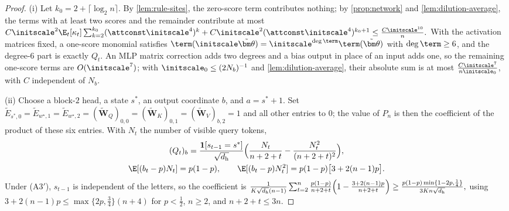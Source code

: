 \begin{proof}
(i) Let $k_0=2+\lceil\log_2n\rceil$. By \cref{lem:rule-sites}, the zero-score term contributes nothing; by \cref{prop:network} and
\cref{lem:dilution-average}, the terms with at least two scores and the remainder contribute at most
 $C\initscale^2\E_t[\kappa_t]\sum_{k=2}^{k_0}(\attconst\initscale^4)^k+C\initscale^2(\attconst\initscale^4)^{k_0+1}\le\frac{C\initscale^{10}}{n} .$ 
With the activation matrices fixed, a one-score monomial satisfies $\term(\initscale\tilde{\bm\theta})=\initscale^{\deg\term}\term(\tilde{\bm\theta})$ with $\deg\term\ge6$, and the
degree-$6$ part is exactly $Q_t$. An MLP matrix correction adds two degrees and a bias output in place of an input adds one, so the
remaining one-score terms are $O(\initscale^7)$; with $\initscale_0\le(2N_b)^{-1}$ and \cref{lem:dilution-average}, their absolute sum is at most
$\frac{C\initscale^7}{n\initscale_0}$, with $C$ independent of $N_b$.

(ii) Choose a block-$2$ head, a state $s^\ast$, an output coordinate $b$, and $a=s^\ast+1$. Set
$\tilde E_{s^\ast,0}=\tilde E_{w^\star,1}=\tilde E_{w^\star,2}=(\tilde{\mathbf W}_Q)_{0,0}=(\tilde{\mathbf W}_K)_{0,1}=(\tilde{\mathbf W}_V)_{b,2}=1$ and all other entries to $0$; the value of $P_n$ is then the
coefficient of the product of these six entries. With $N_t$ the number of visible query tokens,
\begin{gather*}
 (Q_t)_b=\frac{\mathbf 1[s_{t-1}=s^\ast]}{\sqrt{d_{\mathrm h}}}\Bigl(\frac{N_t}{n+2+t}-\frac{N_t^2}{(n+2+t)^2}\Bigr),\\
 \E[(b_t-p)N_t]=p(1-p),\qquad \E[(b_t-p)N_t^2]=p(1-p)\bigl[3+2(n-1)p\bigr].
\end{gather*}
Under (A3$'$), $s_{t-1}$ is independent of the letters, so the coefficient is
 $\frac{1}{K\sqrt{d_{\mathrm h}}(n-1)}\sum_{t=2}^n\frac{p(1-p)}{n+2+t}\Bigl(1-\frac{3+2(n-1)p}{n+2+t}\Bigr) \ge\frac{p(1-p)\min\{1-2p,\frac{1}{4}\}}{3Kn\sqrt{d_{\mathrm h}}},$ 
using $3+2(n-1)p\le\max\{2p,\frac{3}{4}\}(n+4)$ for $p<\frac{1}{2}$, $n\ge2$, and $n+2+t\le3n$.
\end{proof}




